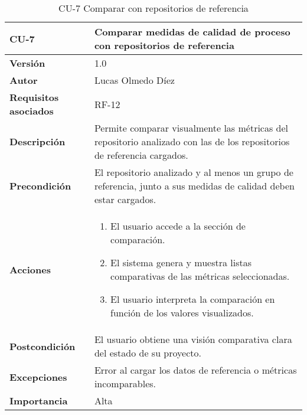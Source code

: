 \clearpage
\begin{table}[p]
    \centering
    \begin{tabularx}{\linewidth}{ p{} p{} }
        \toprule
        \textbf{CU-7} & Comparar medidas de calidad de proceso con repositorios de referencia \\
        \midrule
        \textbf{Versión} & 1.0 \\
        \textbf{Autor} & Lucas Olmedo Díez \\
        \textbf{Requisitos asociados} & RF-12 \\
        \textbf{Descripción} & Permite comparar visualmente las métricas del repositorio analizado con las de los repositorios de referencia cargados. \\
        \textbf{Precondición} & El repositorio analizado y al menos un grupo de referencia, junto a sus medidas de calidad deben estar cargados. \\
        \textbf{Acciones} &
        \begin{enumerate}
            \def\labelenumi{\arabic{enumi}.}
            \tightlist
            \item El usuario accede a la sección de comparación.
            \item El sistema genera y muestra listas comparativas de las métricas seleccionadas.
            \item El usuario interpreta la comparación en función de los valores visualizados.
        \end{enumerate}\\
        \textbf{Postcondición} & El usuario obtiene una visión comparativa clara del estado de su proyecto. \\
        \textbf{Excepciones} & Error al cargar los datos de referencia o métricas incomparables. \\
        \textbf{Importancia} & Alta \\
        \bottomrule
    \end{tabularx}
    \caption{CU-7 Comparar con repositorios de referencia}
\end{table}

